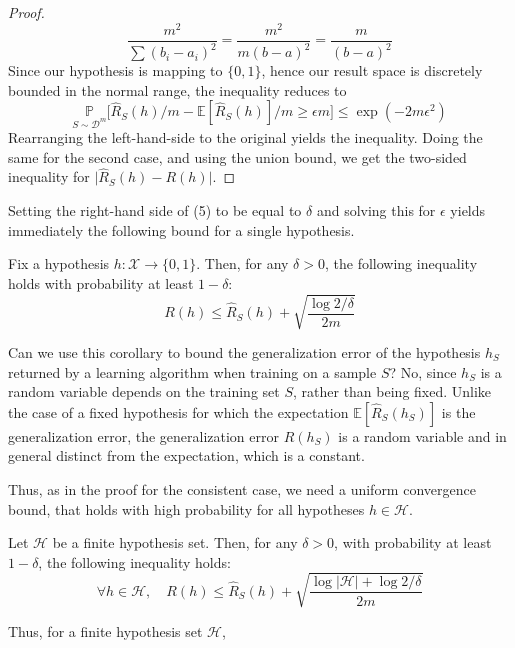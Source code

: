 \begin{proof}
\begin{equation*}
        \frac{m^{2}}{\sum (b_{i} - a_{i})^{2}} = \frac{m^{2}}{m(b-a)^{2}} = \frac{m}{(b-a)^{2}}
    \end{equation*}
    Since our hypothesis is mapping to $\{0,1\}$, hence our result space is discretely bounded in the normal range, the inequality reduces to 
    \begin{equation}
        \underset{S\sim \mathcal{D}^{m}}{\mathbb{P}} \Big[ \hat{R}_{S}(h)/m - \mathbb{E}[\hat{R}_{S}(h)]/m \geq \epsilon m \Big] \leq \exp{\left(-2m\epsilon^{2}\right)}
    \end{equation}
    Rearranging the left-hand-side to the original yields the inequality. Doing the same for the second case, and using the union bound, we get the two-sided inequality for $\lvert \hat{R}_{S}(h) - R(h)\rvert$. 
\end{proof}

Setting the right-hand side of (5) to be equal to $\delta$ and solving this for $\epsilon$ yields immediately the following bound for a single hypothesis. 

\begin{col}
    Fix a hypothesis $h: \mathcal{X}\to \{0,1\}$. Then, for any $\delta > 0$, the following inequality holds with probability at least $1-\delta$: 
    \begin{equation}
        R(h) \leq \hat{R}_S(h) + \sqrt{\frac{\log{2/\delta}}{2m}}
    \end{equation}
\end{col}

Can we use this corollary to bound the generalization error of the hypothesis $h_S$ returned by a learning algorithm when training on a sample $S$? No, since $h_S$ is a random variable depends on the training set $S$, rather than being fixed. Unlike the case of a fixed hypothesis for which the expectation $\mathbb{E}[\hat{R}_S(h_S)]$ is the generalization error, the generalization error $R(h_S)$ is a random variable and in general distinct from the expectation, which is a constant. 

Thus, as in the proof for the consistent case, we need a uniform convergence bound, that holds with high probability for all hypotheses $h\in \mathcal{H}$. 

\begin{theorem}
    Let $\mathcal{H}$ be a finite hypothesis set. Then, for any $\delta > 0$, with probability at least $1-\delta$, the following inequality holds: 
    \begin{equation}
        \forall h \in \mathcal{H}, \quad R(h) \leq \hat{R}_S (h) + \sqrt{\frac{\log{|\mathcal{H}|}+ \log{2/\delta}}{2m}}
    \end{equation}
\end{theorem}
Thus, for a finite hypothesis set $\mathcal{H}$, 

